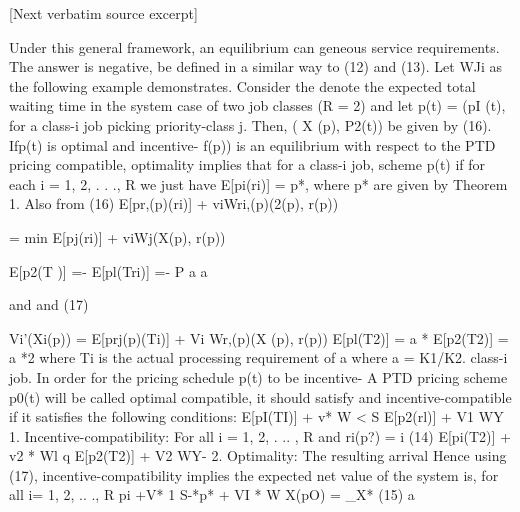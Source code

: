 \documentclass[10pt]{article}
\begin{document}
\begin{ReviewVerbatim}
{{[Next verbatim source excerpt]

  Under this general framework, an equilibrium can                     geneous service requirements. The answer is negative,
be defined in a similar way to (12) and (13). Let WJi                  as the following example demonstrates. Consider the
denote the expected total waiting time in the system                   case of two job classes (R = 2) and let p(t) = (pI (t),
for a class-i job picking priority-class j. Then, ( X (p),            P2(t)) be given by (16). Ifp(t) is optimal and incentive-
f(p)) is an equilibrium with respect to the PTD pricing compatible, optimality implies that for a class-i job,
scheme p(t) if for each i = 1, 2, . . ., R              we just have E[pi(ri)] = p*, where p* are given by
                                                                       Theorem 1. Also from (16)
E[pr,(p)(ri)] + viWri,(p)(2(p), r(p))

   = min E[pj(ri)] + viWj(X(p), r(p))}                                 E[p2(T )] =- E[pl(Tri)] =- P
                                                                                             a   a


and                                                                          and                          (17)

Vi'(Xi(p)) = E[prj(p)(Ti)] + Vi Wr,(p)(X (p), r(p))
                                                                       E[pl(T2)] = a * E[p2(T2)] = a *2
where Ti is the actual processing requirement of a
                                                                      where a = K1/K2.
class-i job.
                                                                         In order for the pricing schedule p(t) to be incentive-
  A PTD pricing scheme p0(t) will be called optimal
                                                                       compatible, it should satisfy
and incentive-compatible if it satisfies the following
conditions:
                                                                       E[pI(TI)] + v* W < S E[p2(rl)] + V1 WY
   1. Incentive-compatibility: For all i = 1, 2, . .. , R
                                                                       and
   ri(p?)                   =        i      (14)
                                                                       E[pi(T2)] + v2 * Wl q E[p2(T2)] + V2 WY-
      2.       Optimality:                                       The                 resulting                         arrival
                                                                       Hence using (17), incentive-compatibility implies
  the expected                                          net                value                 of        the            system
is, for all i= 1, 2, .. ., R
                                                                       pi +V* 1 S-*p* + VI * W
  X(pO)                =     _X*                (15)                                         a



}
\end{ReviewVerbatim}
\end{document}

